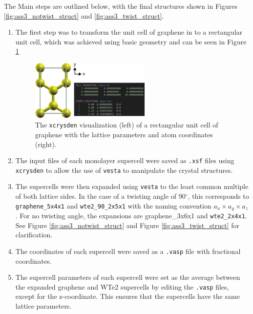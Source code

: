 \documentclass[10pt,a4paper]{labreport}
\begin{document}
The Main steps are outlined below, with the final structures shown in Figures \ref{fig:ass3_notwist_struct} and \ref{fig:ass3_twist_struct}.
\begin{enumerate}
  \item The first step was to transform the unit cell of graphene in to a rectangular unit cell, which was achieved using basic geometry and can be seen in Figure \ref{fig:ass3_grapheneRect}
  \begin{figure}[h!]
  \centering 
  \includegraphics[width = 0.56\textwidth]{figs/ass3_grapheneRect.png}
  \caption{The \texttt{xcrysden} visualization (left) of a rectangular unit cell of graphene with the lattice parameters and atom coordinates (right).}
  \label{fig:ass3_grapheneRect}
\end{figure}

  \item The input files of each monolayer supercell were saved as \texttt{.xsf} files using \texttt{xcrysden} to allow the use of \texttt{vesta} to manipulate the crystal structures. 

  \item The supercells were then expanded using \texttt{vesta} to the least common multiple of both lattice sides. In the case of a twisting angle of 90$^\circ$, this corresponds to \texttt{graphene\_5x4x1} and \texttt{wte2\_90\_2x5x1} with the naming convention $a_x\times a_y \times a_z$. For no twisting angle, the expansions are {graphene\_3x6x1} and \texttt{wte2\_2x4x1}. See Figure \ref{fig:ass3_notwist_struct} and Figure \ref{fig:ass3_twist_struct} for clarification.  
  
  \item  The coordinates of each supercell were saved as a \texttt{.vasp} file with fractional coordinates. 
  
  \item The supercell parameters  of each supercell were set as the average between the expanded graphene and WTe2 supercells by editing the \texttt{.vasp} files, except for the z-coordinate. 
  This ensures that the supercells have the same lattice parameters. 
 

\end{enumerate}
\end{document}
